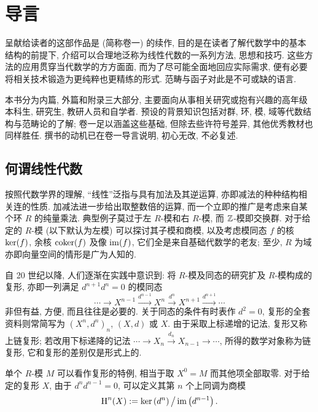
\chapter*{导言}	%

呈献给读者的这部作品是 \cite{Li1} (简称卷一) 的续作, 目的是在读者了解代数学中的基本结构的前提下, 介绍可以合理地泛称为线性代数的一系列方法, 思想和技巧. 这些方法的应用贯穿当代数学的方方面面, 而为了尽可能全面地回应实际需求, 便有必要将相关技术锻造为更纯粹也更精练的形式. 范畴与函子对此是不可或缺的语言.

本书分为内篇, 外篇和附录三大部分, 主要面向从事相关研究或抱有兴趣的高年级本科生, 研究生, 教研人员和自学者. 预设的背景知识包括对群, 环, 模, 域等代数结构与范畴论的了解; 卷一足以涵盖这些基础, 但除去些许符号差异, 其他优秀教材也同样胜任. 撰书的动机已在卷一导言说明, 初心无改, 不必复述.

\section*{何谓线性代数}
按照代数学界的理解, ``线性''泛指与具有加法及其逆运算, 亦即减法的种种结构相关连的性质. 加减法进一步给出取整数倍的运算, 而一个立即的推广是考虑来自某个环 $R$ 的纯量乘法. 典型例子莫过于左 $R$-模和右 $R$-模, 而 $\mathbb{Z}$-模即交换群. 对于给定的 $R$-模 (以下默认为左模) 可以探讨其子模和商模, 以及考虑模同态 $f$ 的核 $\operatorname{ker}(f)$, 余核 $\operatorname{coker}(f)$ 及像 $\operatorname{im}(f)$, 它们全是来自基础代数学的老友; 至少, $R$ 为域亦即向量空间的情形是广为人知的.

自 20 世纪以降, 人们逐渐在实践中意识到: 将 $R$-模及同态的研究扩及 $R$-模构成的复形, 亦即一列满足 $d^{n+1} d^n = 0$ 的模同态
\[ \cdots \to X^{n-1} \xrightarrow{d^{n-1}} X^n \xrightarrow{d^n} X^{n+1} \xrightarrow{d^{n+1}} \cdots \]
非但有益, 方便, 而且往往是必要的. 关于同态的条件有时表作 $d^2 = 0$, 复形的全套资料则常简写为 $(X^n, d^n)_n$, $(X, d)$ 或 $X$. 由于采取上标递增的记法, 复形又称上链复形; 若改用下标递降的记法 $\cdots \to X_n \xrightarrow{d_n} X_{n-1} \to \cdots$, 所得的数学对象称为链复形, 它和复形的差别仅是形式上的.

单个 $R$-模 $M$ 可以看作复形的特例, 相当于取 $X^0 = M$ 而其他项全部取零. 对于给定的复形 $X$, 由于 $d^n d^{n-1} = 0$, 可以定义其第 $n$ 个上同调为商模
\[ \operatorname{H}^n(X) := \operatorname{ker}\left(d^n \right) \big/ \operatorname{im}\left(d^{n-1} \right). \]

